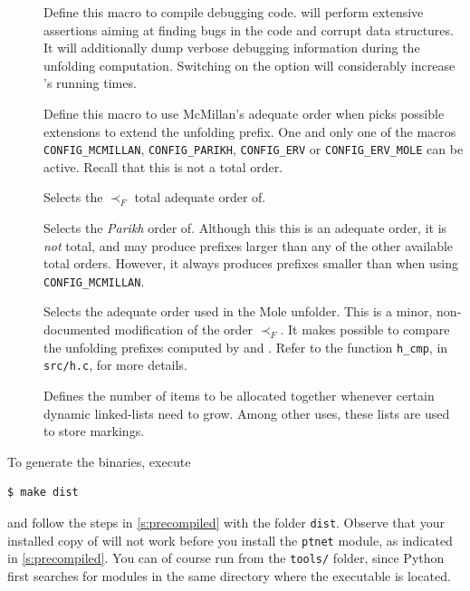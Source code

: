 \documentclass[a4paper]{refart}
\begin{document}
\begin{description}
\item[]  Define this macro to compile debugging code.
\cunf will perform extensive assertions aiming at finding bugs in the code and
corrupt data structures.  It will additionally dump verbose debugging
information during the unfolding computation.  Switching on the option will
considerably increase \cunf's running times.

\item[]  Define this macro to use McMillan's adequate
order\cite{MM95} when \cunf picks possible extensions to extend the
unfolding prefix.  One and only one of the macros \verb!CONFIG_MCMILLAN!,
\verb!CONFIG_PARIKH!, \verb!CONFIG_ERV! or \verb!CONFIG_ERV_MOLE!
can be active.  Recall that this is not a total order.

\item[]  Selects the $\prec_F$ total adequate order
of\cite{ERV02}.

\item[]  Selects the \emph{Parikh} order
of\cite[definition 4.46]{EH08}.
Although this this is an adequate order, it is \emph{not} total, and may
produce prefixes larger than any of the other available total orders.
However, it always produces prefixes smaller than when using
\verb!CONFIG_MCMILLAN!.

\item[]  Selects the adequate order used in the Mole
unfolder\cite{Mole}.  This is a minor, non-documented modification of
the order $\prec_F$.  It makes possible to compare the unfolding prefixes
computed by \cunf and \mole.  Refer to the function \verb!h_cmp!, in
\verb!src/h.c!, for more details.

\item[]  Defines the number of items to be
allocated together whenever certain dynamic linked-lists need to grow.  Among
other uses, these lists are used to store markings.

\end{description}

To generate the binaries, execute
\begin{verbatim}
$ make dist
\end{verbatim}
and follow the steps in \cref{s:precompiled} with the folder \verb!dist!.
Observe that your installed copy of \cna will not work before you install the
\verb!ptnet! module, as indicated in \cref{s:precompiled}.
You can of course run \cna from the \verb!tools/! folder, since Python first
searches for modules in the same directory where the executable is located.
\end{document}
